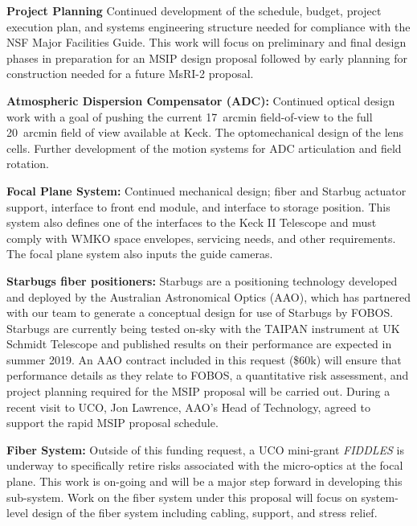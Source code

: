 \noindent \textbf{Project Planning} Continued development of the
schedule, budget, project execution plan, and systems engineering
structure needed for compliance with the NSF Major Facilities Guide.
This work will focus on preliminary and final design phases in
preparation for an MSIP design proposal followed by early planning for
construction needed for a future MsRI-2 proposal. 

\noindent \textbf{Atmospheric Dispersion Compensator (ADC):} Continued
optical design work with a goal of pushing the current 17~arcmin field-of-view
to the full 20~arcmin field of view available at Keck.  The
optomechanical design of the lens cells.  Further development of the
motion systems for ADC articulation and field rotation.

\noindent \textbf{Focal Plane System:} Continued mechanical design;
fiber and Starbug actuator support, interface to front end module, and
interface to storage position. This system also defines one of the
interfaces to the Keck II Telescope and must comply with WMKO space
envelopes, servicing needs, and other requirements. The focal plane
system also inputs the guide cameras. 

\noindent \textbf{Starbugs fiber positioners:} Starbugs are a
positioning technology developed and deployed by the Australian Astronomical Optics (AAO), which has partnered with our
team to generate a conceptual design for use of Starbugs by FOBOS.  Starbugs are currently being tested on-sky with the
TAIPAN instrument at UK Schmidt Telescope and published results on their performance are expected in summer 2019.  An
AAO contract included in this request (\$60k) will ensure that performance details as they relate to FOBOS, a
quantitative risk assessment, and project planning required for the MSIP proposal will be carried out.  During a recent
visit to UCO, Jon Lawrence, AAO's Head of Technology, agreed to support the rapid MSIP proposal schedule.

\noindent \textbf{Fiber System:} Outside of this funding request, a UCO
mini-grant {\it FIDDLES} is underway to specifically retire
risks associated with the micro-optics at the focal plane.  This work is
on-going and will be a major step forward in developing this sub-system.
Work on the fiber system under this proposal will focus on system-level
design of the fiber system including cabling, support, and stress relief. 


